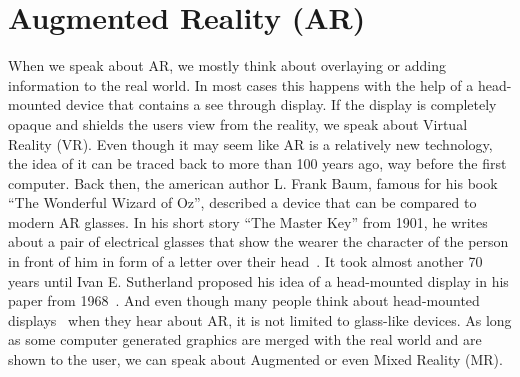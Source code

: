\chapter{Augmented Reality (AR)}
\label{cha:ar}

When we speak about AR, we mostly think about overlaying or adding information to the real world. In most cases this happens with the help of a head-mounted device that contains a see through display. If the display is completely opaque and shields the users view from the reality, we speak about Virtual Reality (VR). \newline
Even though it may seem like AR is a relatively new technology, the idea of it can be traced back to more than 100 years ago, way before the first computer. Back then, the american author L. Frank Baum, famous for his book ``The Wonderful Wizard of Oz'', described a device that can be compared to modern AR glasses. In his short story ``The Master Key'' from 1901, he writes about a pair of electrical glasses that show the wearer the character of the person in front of him in form of a letter over their head~\cite{baum96}. It took almost another 70 years until Ivan E. Sutherland proposed his idea of a head-mounted display in his paper from 1968~\cite{sutherland68}.
And even though many people think about head-mounted displays~\cite{milgram94} when they hear about AR, it is not limited to glass-like devices. As long as some computer generated graphics are merged with the real world and are shown to the user, we can speak about Augmented or even Mixed Reality (MR). 


